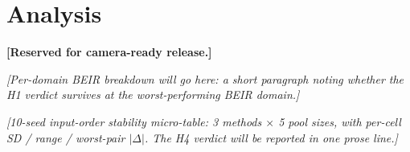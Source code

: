 \section{Analysis}
\label{sec:analysis}

\textbf{[Reserved for camera-ready release.]}

\textit{[Per-domain BEIR breakdown will go here: a short paragraph noting
whether the H1 verdict survives at the worst-performing BEIR domain.]}

\textit{[10-seed input-order stability micro-table: 3 methods $\times$ 5
pool sizes, with per-cell SD / range / worst-pair $|\Delta|$. The H4
verdict will be reported in one prose line.]}
